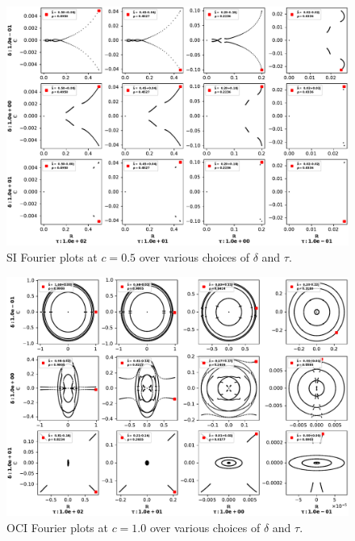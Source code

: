 \begin{figure}
\begin{center}
	\includegraphics[width=\textwidth]{appendix/eig_plots/si0.5.pdf}
	\caption{SI Fourier plots at $c=0.5$ over various choices of $\delta$ and $\tau$.}
\end{center}
\end{figure}

\begin{figure}
\begin{center}
	\includegraphics[width=\textwidth]{appendix/eig_plots/oci1.0.pdf}
	\caption{OCI Fourier plots at $c=1.0$ over various choices of $\delta$ and $\tau$.}
\end{center}
\end{figure}


